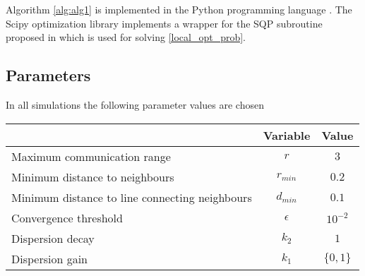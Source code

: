 Algorithm \ref{alg:alg1} is implemented in the Python programming language \cite{python}. The Scipy \cite{2020SciPy-NMeth} optimization library implements a wrapper
for the SQP subroutine proposed in \cite{kraft1988software} which is used for solving \eqref{local_opt_prob}.
\subsection{Parameters}
In all simulations the following parameter values are chosen
\begin{center}
  \begin{tabular}{l|c|c}
     & Variable & Value\\
    \hline
    Maximum communication range & $r$ & $3$\\
    Minimum distance to neighbours & $r_{min}$ & $0.2$\\
    Minimum distance to line connecting neighbours & $d_{min}$ & $0.1$\\
    Convergence threshold & $\epsilon$ & $10^{-2}$\\
    Dispersion decay & $k_{2}$ & $1$\\
    Dispersion gain & $k_{1}$ & $\{0, 1\}$
  \end{tabular}
\end{center}